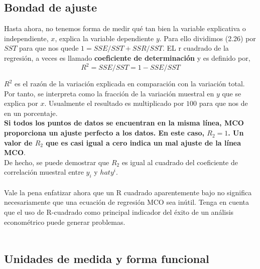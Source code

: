 \subsection{Bondad de ajuste}
Hasta ahora, no tenemos forma de medir qué tan bien la variable explicativa o independiente, $x$, explica la variable dependiente $y$. Para ello dividimos (2.26) por $SST$ para que nos quede $1=SSE/SST + SSR/SST$. EL r cuadrado de la regresión, a veces es llamado \textbf{coeficiente de determinación} y es definido por,
\begin{equation}
	R^2 = SSE/SST = 1 - SSE/SST
\end{equation}

$R^2$ es el razón de la variación explicada en comparación con la variación total. Por tanto, se interpreta como la fracción de la variación muestral en $y$ que se explica por $x$. Usualmente el resultado es multiplicado por $100$ para que nos de en un porcentaje.\\
\textbf{Si todos los puntos de datos se encuentran en la misma línea, MCO proporciona un ajuste perfecto a los datos. En este caso, $R_2 = 1$. Un valor de $R_2$ que es casi igual a cero indica un mal ajuste de la línea MCO}.\\
De hecho, se puede demostrar que $R_2$ es igual al cuadrado del coeficiente de correlación muestral entre $y_i$ y $hat{y}^i$.\\\\
Vale la pena enfatizar ahora que un R cuadrado aparentemente bajo no significa necesariamente que una ecuación de regresión MCO sea inútil. Tenga en cuenta que el uso de R-cuadrado como principal indicador del éxito de un análisis econométrico puede generar problemas.\\\\

\subsection{Unidades de medida y forma funcional}
